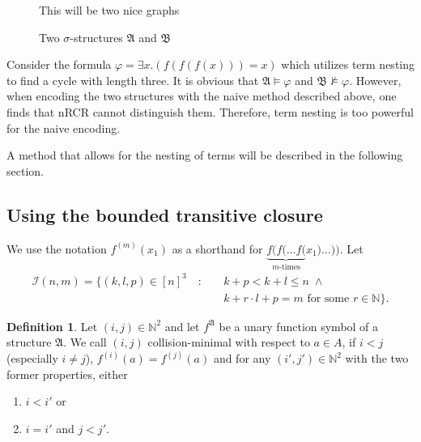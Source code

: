 \documentclass[a4paper,11pt,DIV=15]{scrartcl} %
\renewcommand{\phi}{\varphi}
\theoremstyle{plain}
\theoremstyle{definition}
\newtheorem{definition}[theorem]{Definition}
\begin{document}
\begin{figure}[h]
	This will be two nice graphs
	
	\caption{Two $\sigma$-structures $\mathfrak A$ and $\mathfrak B$}
	\label{NaiveEncodingCounterexample}
\end{figure}

Consider the formula $\phi=\exists x.(f(f(f(x)))=x)$ which utilizes term nesting to find a cycle with length three.
It is obvious that $\mathfrak A \models \phi$ and $\mathfrak B\not\models \phi$.
However, when encoding the two structures with the naive method described above, one finds that nRCR cannot distinguish them.
Therefore, term nesting is too powerful for the naive encoding.

A method that allows for the nesting of terms will be described in the following section.




\subsection{Using the bounded transitive closure} 

We use the notation $f^{(m)}(x_1)$ as a shorthand for 
$\underbrace{f(f(\dots f(}_{m\text{-times}}x_1) \dots))$.
\break
Let 
\begin{align*}
\mathcal I(n,m)=\{(k,l,p)\in [n]^3 \quad:\quad & k+p < k+l \leq n \; \land \\
& k+r\cdot l + p = m \text{ for some } r\in \mathbb N\}.
\end{align*}

\begin{definition}
	Let $(i,j)\in \mathbb N^2$ and let $f^\mathfrak A$ be a unary function symbol of a structure $\mathfrak A$. 
	We call $(i,j)$ collision-minimal with respect to $a\in A$, if $i<j$ (especially $i\neq j$),  $f^{(i)}(a)= f^{(j)}(a)$ and for any $(i',j')\in \mathbb N^2$ with the two former properties, either
	\begin{enumerate}
		\item $i < i'$ or
		\item $i=i'$ and $j < j'$.
	\end{enumerate} 
\end{definition}
\end{document}
